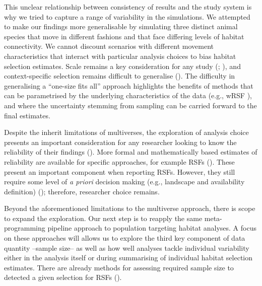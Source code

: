 \documentclass[10pt,a4paper]{article}
\begin{document}
This unclear relationship between consistency of results and the study system is why we tried to capture a range of variability in the simulations.
We attempted to make our findings more generalisable by simulating three distinct animal species that move in different fashions and that face differing levels of habitat connectivity.
We cannot discount scenarios with different movement characteristics that interact with particular analysis choices to bias habitat selection estimates.
Scale remains a key consideration for any study (; ), and context-specific selection remains difficult to generalise ().
The difficulty in generalising a ``one-size fits all'' approach highlights the benefits of methods that can be parametrised by the underlying characteristics of the data (e.g., wRSF ), and where the uncertainty stemming from sampling can be carried forward to the final estimates.

Despite the inherit limitations of multiverses, the exploration of analysis choice presents an important consideration for any researcher looking to know the reliability of their findings ().
More formal and mathematically based estimates of reliability are available for specific approaches, for example RSFs ().
These present an important component when reporting RSFs.
However, they still require some level of \emph{a priori} decision making (e.g., landscape and availability definition) (); therefore, researcher choice remains.

Beyond the aforementioned limitations to the multiverse approach, there is scope to expand the exploration.
Our next step is to reapply the same meta-programming pipeline approach to population targeting habitat analyses.
A focus on these approaches will allows us to explore the third key component of data quantity --sample size-- as well as how well analyses tackle individual variability either in the analysis itself or during summarising of individual habitat selection estimates.
There are already methods for assessing required sample size to detected a given selection for RSFs ().
\end{document}
